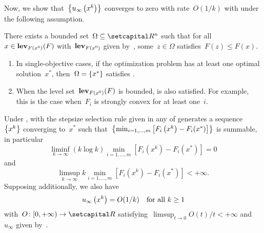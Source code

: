\documentclass[../../main]{subfiles}
\begin{document}
Now, we show that~$\set*{u_\infty\left(x^k\right)}$ converges to zero with rate~$O(1 / k)$ with  under the following assumption.
\begin{assumption} 
    There exists a bounded set~$\Omega \subseteq \setR^n$ such that for all~$x \in \level_{F(x^0)}(F)$ with~$\level_{F(x^0)}$ given by~, some~$z \in \Omega$ satisfies~$F(z) \le F(x)$.
\end{assumption}
\begin{remark}
    \begin{enumerate}
        \item In single-objective cases, if the optimization problem has at least one optimal solution~$x^*$, then~$\Omega = \set{x^*}$ satisfies .
        \item When the level set~$\level_{F(x^0)}(F)$ is bounded,  is also satisfied.
              For example, this is the case when~$F_i$ is strongly convex for at least one~$i$.
    \end{enumerate}
\end{remark}
\begin{theorem} 
    Under ,  with the stepsize selection rule given in any of  generates a sequence~$\set*{x^k}$ converging to~$x^*$ such that~$\set*{\min_{i = 1, \dots, m} \left[F_i\left(x^k\right) - F_i(x^*)\right]}$ is summable, in particular
    \begin{equation}
        \liminf_{k \to \infty} (k \log k) \min_{i = 1, \dots, m} \left[F_i\left(x^k\right) - F_i(x^*)\right] = 0
    \end{equation}
    and
    \begin{equation}
        \limsup_{k \to \infty} k \min_{i = 1, \dots, m} \left[F_i\left(x^k\right) - F_i(x^*)\right] < + \infty
        .\end{equation}
    Supposing  additionally, we also have
    \begin{equation}
        u_\infty\left(x^k\right) = O(1 / k) \forallcondition{k \ge 1}
    \end{equation}
    with~$O \colon [0, + \infty) \to \setR$ satisfying~$\limsup_{t \to 0} O(t) / t < + \infty$ and~$u_\infty$ given by~.
\end{theorem}
\end{document}

